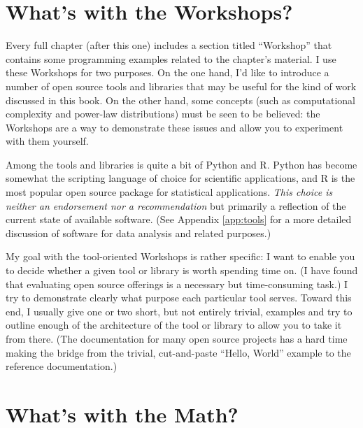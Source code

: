 
\section{What's with the Workshops?}

Every full chapter (after this one) includes a section titled
``Workshop'' that contains some programming examples related to the
chapter's material.  I use these Workshops for two purposes. On the
one hand, I'd like to introduce a number of open source tools and
libraries that may be useful for the kind of work discussed in this
book. On the other hand, some concepts (such as computational
complexity and power-law distributions) must be seen to be believed:
the Workshops are a way to demonstrate these issues and allow you to
experiment with them yourself.

Among the tools and libraries is quite a bit of Python and R. Python
has become somewhat the scripting language of choice for scientific
applications, and R is the most popular open source package for
statistical applications. \emph{This choice is neither an endorsement
  nor a recommendation} but primarily a reflection of the current
state of available software. (See Appendix \ref{app:tools} for a more
detailed discussion of software for data analysis and related
purposes.)

My goal with the tool-oriented Workshops is rather specific: I want to
enable you to decide whether a given tool or library is worth spending
time on. (I have found that evaluating open source offerings is a
necessary but time-consuming task.) I try to demonstrate clearly what
purpose each particular tool serves. Toward this end, I usually give
one or two short, but not entirely trivial, examples and try to outline
enough of the architecture of the tool or library to allow you to
take it from there.  (The documentation for many open source
projects has a hard time making the bridge from the trivial,
cut-and-paste ``Hello, World'' example to the reference
documentation.)

\section{What's with the Math?}



